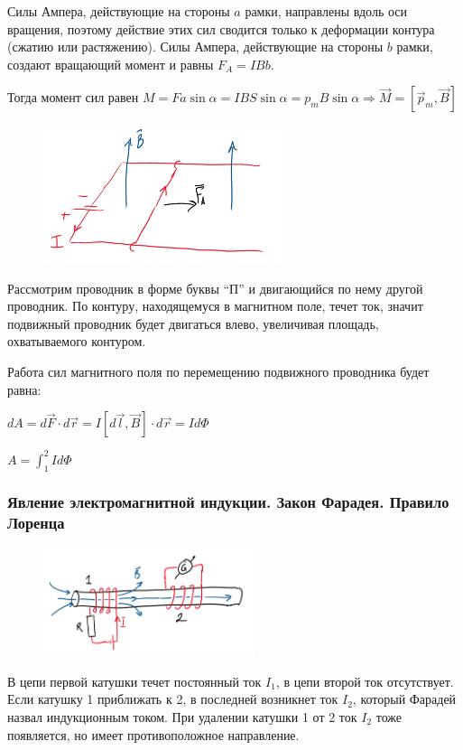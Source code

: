 \documentclass[12pt]{article}
\begin{document}
Силы Ампера, действующие на стороны $a$ рамки, направлены вдоль оси вращения, 
поэтому действие этих сил сводится только к деформации контура (сжатию или растяжению).
Силы Ампера, действующие на стороны $b$ рамки, создают вращающий момент и равны $F_A = IBb$.

Тогда момент сил равен $M = F a \sin \alpha = I B S \sin \alpha = p_m B \sin \alpha \Longrightarrow \vec{M} = [\vec{p}_m, \vec{B}]$

\begin{figure}
    \includegraphics[width=7cm]{physics2/images/physics2_2025_02_24_3}
\end{figure}

\Ex Рассмотрим проводник в форме буквы \enquote{П} и двигающийся по нему другой проводник. 
По контуру, находящемуся в магнитном поле, течет ток, значит подвижный проводник будет двигаться влево, 
увеличивая площадь, охватываемого контуром. 

Работа сил магнитного поля по перемещению подвижного проводника будет равна:

$dA = d\vec{F} \cdot d\vec{r} = I [d\vec{l}, \vec{B}] \cdot d\vec{r} = Id\Phi$

$A = \int_1^2 Id\Phi$


\subsubsection{Явление электромагнитной индукции. Закон Фарадея. Правило Лоренца}

\begin{figure}
    \includegraphics[width=6.2cm]{physics2/images/physics2_2025_02_24_4}
\end{figure}

В цепи первой катушки течет постоянный ток $I_1$, в цепи второй ток отсутствует. 
Если катушку 1 приближать к 2, в последней возникнет ток $I_2$, который Фарадей назвал индукционным током. 
При удалении катушки 1 от 2 ток $I_2$ тоже появляется, но имеет противоположное направление.
\end{document}
